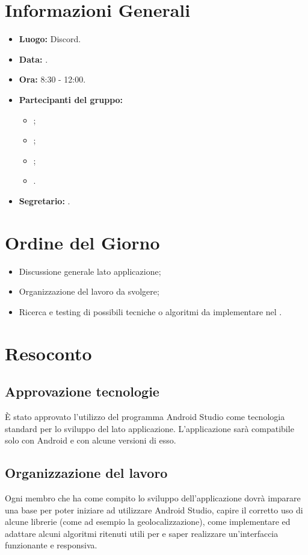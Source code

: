\section{Informazioni Generali}
\begin{itemize}
\item \textbf{Luogo:} Discord.
\item \textbf{Data:} \Data.
\item \textbf{Ora:} 8:30 - 12:00.
\item \textbf{Partecipanti del gruppo:}
	\begin{itemize}
		\item \DF{};
		\item \MC{};
		\item \SE{};
		\item \BR{}.
	\end{itemize} 
\item \textbf{Segretario:} \MC{}.
\end{itemize}

\section{Ordine del Giorno}
\begin{itemize}
	\item Discussione generale lato applicazione;
	\item Organizzazione del lavoro da svolgere;
	\item Ricerca e testing di possibili tecniche o algoritmi da implementare nel .
\end{itemize}


\section{Resoconto}
\subsection{Approvazione tecnologie}
È stato approvato l'utilizzo del programma Android Studio come tecnologia standard per lo sviluppo del  lato applicazione. L'applicazione sarà compatibile solo
con Android e con alcune versioni di esso.

\subsection{Organizzazione del lavoro}
Ogni membro che ha come compito lo sviluppo dell'applicazione dovrà imparare una base per poter iniziare ad utilizzare Android Studio, capire il corretto uso di alcune
librerie (come ad esempio la geolocalizzazione), come implementare ed adattare alcuni algoritmi ritenuti utili per  e saper realizzare un'interfaccia
 funzionante e responsiva.

